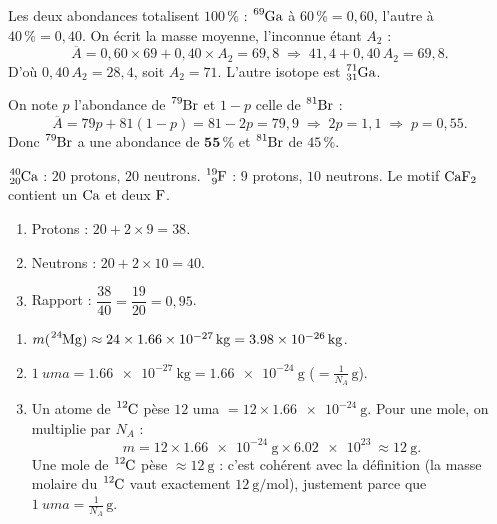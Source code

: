 \documentclass[11pt,a4paper]{article}
\begin{document}
\begin{corrige}
Les deux abondances totalisent $100\,\%$ : $\ce{^{69}Ga}$ à $60\,\% = 0{,}60$, l'autre à
$40\,\% = 0{,}40$. On écrit la masse moyenne, l'inconnue étant $A_2$ :
\[ \overline{A} = 0{,}60\times 69 + 0{,}40\times A_2 = 69{,}8
   \;\Longrightarrow\; 41{,}4 + 0{,}40\,A_2 = 69{,}8. \]
D'où $0{,}40\,A_2 = 28{,}4$, soit $A_2 = 71$. L'autre isotope est $\ce{^{71}_{31}Ga}$.
\end{corrige}

\begin{corrige}
On note $p$ l'abondance de $\ce{^{79}Br}$ et $1-p$ celle de $\ce{^{81}Br}$ :
\[ \overline{A} = 79p + 81(1-p) = 81 - 2p = 79{,}9 \;\Longrightarrow\; 2p = 1{,}1 \;\Longrightarrow\;
   p = 0{,}55. \]
Donc $\ce{^{79}Br}$ a une abondance de $\mathbf{55\,\%}$ et $\ce{^{81}Br}$ de $45\,\%$.
\end{corrige}

\begin{corrige}
$\ce{^{40}_{20}Ca}$ : $20$ protons, $20$ neutrons. \quad $\ce{^{19}_{9}F}$ : $9$ protons,
$10$ neutrons. Le motif $\ce{CaF2}$ contient un $\ce{Ca}$ et deux $\ce{F}$.
\begin{enumerate}[label=\alph*)]
  \item Protons : $20 + 2\times 9 = 38$.
  \item Neutrons : $20 + 2\times 10 = 40$.
  \item Rapport : $\dfrac{38}{40} = \dfrac{19}{20} = 0{,}95$.
\end{enumerate}
\end{corrige}

\begin{corrige}
\begin{enumerate}[label=\alph*)]
  \item $m(\ce{^{24}Mg}) \approx 24 \times \SI{1,66e-27}{\kilo\gram} = \SI{3,98e-26}{\kilo\gram}$.
  \item $\SI{1}{uma} = \SI{1,66e-27}{\kilo\gram} = \SI{1,66e-24}{\gram}$
        \big($= \tfrac{1}{N_{\!A}}\,\si{\gram}$\big).
  \item Un atome de $\ce{^{12}C}$ pèse $12$ uma $= 12\times \SI{1,66e-24}{\gram}$. Pour une mole, on
        multiplie par $N_{\!A}$ :
        \[ m = 12 \times \SI{1,66e-24}{\gram} \times \SI{6,02e23}{} \approx \SI{12}{\gram}. \]
        Une mole de $\ce{^{12}C}$ pèse $\approx \SI{12}{\gram}$ : c'est cohérent avec la définition
        (la masse molaire du $\ce{^{12}C}$ vaut exactement $\SI{12}{\gram\per\mole}$), justement parce
        que $\SI{1}{uma} = \tfrac{1}{N_{\!A}}\,\si{\gram}$.
\end{enumerate}
\end{corrige}
\end{document}
